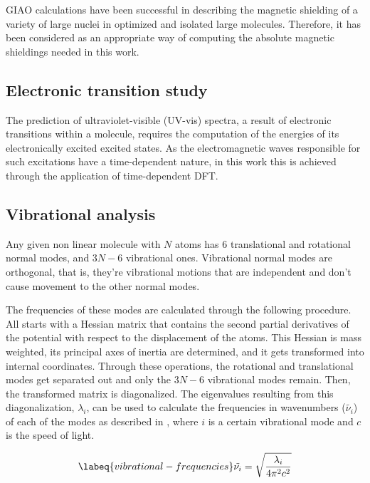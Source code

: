 GIAO calculations have been successful in describing the magnetic shielding of a variety of large nuclei in optimized and isolated large molecules. Therefore, it has been considered as an appropriate way of computing the absolute magnetic shieldings needed in this work.

\subsection{Electronic transition study}
The prediction of ultraviolet-visible (UV-vis) spectra, a result of electronic transitions within a molecule, requires the computation of the energies of its electronically excited excited states.
As the electromagnetic waves responsible for such excitations have a time-dependent nature, in this work this is achieved through the application of time-dependent DFT.

\subsection{Vibrational analysis}
Any given non linear molecule with $N$ atoms has 6 translational and rotational normal modes, and $3N-6$ vibrational ones.
Vibrational normal modes are orthogonal, that is, they're vibrational motions that are independent and don't cause movement to the other normal modes.

The frequencies of these modes are calculated through the following procedure.
All starts with a Hessian matrix that contains the second partial derivatives of the potential with respect to the displacement of the atoms.
This Hessian is mass weighted, its principal axes of inertia are determined, and it gets transformed into internal coordinates.
Through these operations, the rotational and translational modes get separated out and only the $3N-6$ vibrational modes remain.
Then, the transformed matrix is diagonalized.
The eigenvalues resulting from this diagonalization, $\lambda_i$, can be used to calculate the frequencies in wavenumbers ($\tilde{\nu_i}$) of each of the modes as described in , where $i$ is a certain vibrational mode and $c$ is the speed of light.

\begin{equation}
    \labeq{vibrational-frequencies}
    \tilde{\nu_i} = \sqrt{\frac{\lambda_i}{4 \pi^2 c^2}}
\end{equation}

